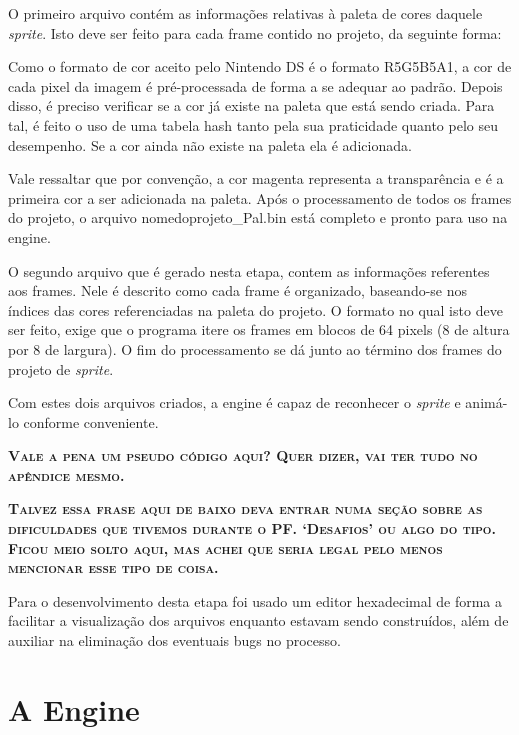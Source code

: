 \documentclass[brazil]{abnt}
\begin{document}
O primeiro arquivo contém as informações relativas à paleta de cores daquele \textit{sprite}. Isto deve ser feito para cada frame contido no projeto, da seguinte forma:

Como o formato de cor aceito pelo Nintendo DS é o formato R5G5B5A1\footnotemark, a cor de cada pixel da imagem é pré-processada de forma a se adequar ao padrão. Depois disso, é preciso verificar se a cor já existe na paleta que está sendo criada. Para tal, é feito o uso de uma tabela hash tanto pela sua praticidade quanto pelo seu desempenho. Se a cor ainda não existe na paleta ela é adicionada. 

Vale ressaltar que por convenção, a cor magenta representa a transparência e é a primeira cor a ser adicionada na paleta. Após o processamento de todos os frames do projeto, o arquivo nomedoprojeto\_Pal.bin está completo e pronto para uso na engine.

O segundo arquivo que é gerado nesta etapa, contem as informações referentes aos frames. Nele é descrito como cada frame é organizado, baseando-se nos índices das cores referenciadas na paleta do projeto. O formato no qual isto deve ser feito, exige que o programa itere os frames em blocos de 64 pixels (8 de altura por 8 de largura). O fim do processamento se dá junto ao término dos frames do projeto de \textit{sprite}. 

Com estes dois arquivos criados, a engine é capaz de reconhecer o \textit{sprite} e animá-lo conforme conveniente. 

\textsc{\textbf{Vale a pena um pseudo código aqui? Quer dizer, vai ter tudo no apêndice mesmo.}}

\textsc{\textbf{Talvez essa frase aqui de baixo deva entrar numa seção sobre as dificuldades que tivemos durante o PF. ‘Desafios’ ou algo do tipo. Ficou meio solto aqui, mas achei que seria legal pelo menos mencionar esse tipo de coisa.}}

Para o desenvolvimento desta etapa foi usado um editor hexadecimal de forma a facilitar a visualização dos arquivos enquanto estavam sendo construídos, além de auxiliar na eliminação dos eventuais bugs no processo. 

\chapter{A Engine}
\end{document}
